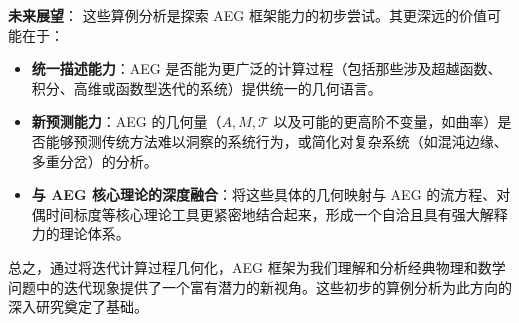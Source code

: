 \documentclass[12pt]{article}
\begin{document}
\textbf{未来展望}：
这些算例分析是探索 AEG 框架能力的初步尝试。其更深远的价值可能在于：
\begin{itemize}
    \item \textbf{统一描述能力}：AEG 是否能为更广泛的计算过程（包括那些涉及超越函数、积分、高维或函数型迭代的系统）提供统一的几何语言。
    \item \textbf{新预测能力}：AEG 的几何量（$A, M, \mathcal{T}$ 以及可能的更高阶不变量，如曲率）是否能够预测传统方法难以洞察的系统行为，或简化对复杂系统（如混沌边缘、多重分岔）的分析。
    \item \textbf{与 AEG 核心理论的深度融合}：将这些具体的几何映射与 AEG 的流方程、对偶时间标度等核心理论工具更紧密地结合起来，形成一个自洽且具有强大解释力的理论体系。
\end{itemize}

总之，通过将迭代计算过程几何化，AEG 框架为我们理解和分析经典物理和数学问题中的迭代现象提供了一个富有潜力的新视角。这些初步的算例分析为此方向的深入研究奠定了基础。
\end{document}
